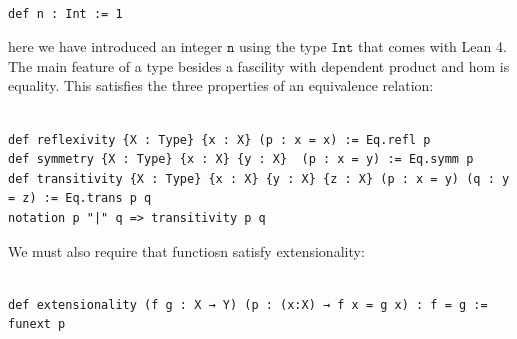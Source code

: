 \documentclass{book}
\newcounter{lcounter}
\begin{document}
\begin{center}
\begin{tcolorbox}[width=5in,colback={white},title={\begin{center}\texttt{Lean \thelcounter} \addtocounter{lcounter}{1}  \end{center}},colbacktitle=Blue,coltitle=black]
\begin{verbatim}

def n : Int := 1

\end{verbatim}%
\end{tcolorbox}
\end{center}

here we have introduced an integer $\texttt{n}$ using the type $\texttt{Int}$ that comes with Lean 4. The main feature of a type besides a fascility with dependent product and hom is equality. This satisfies the three properties of an equivalence relation:

\begin{center}
\begin{tcolorbox}[width=5in,colback={white},title={\begin{center}\texttt{Lean \thelcounter} \addtocounter{lcounter}{1}  \end{center}},colbacktitle=Blue,coltitle=black]
\begin{verbatim}

def reflexivity {X : Type} {x : X} (p : x = x) := Eq.refl p
def symmetry {X : Type} {x : X} {y : X}  (p : x = y) := Eq.symm p
def transitivity {X : Type} {x : X} {y : X} {z : X} (p : x = y) (q : y = z) := Eq.trans p q
notation p "|" q => transitivity p q

\end{verbatim}%
\end{tcolorbox}
\end{center}

We must also require that functiosn satisfy extensionality:

\begin{center}
\begin{tcolorbox}[width=5in,colback={white},title={\begin{center}\texttt{Lean \thelcounter} \addtocounter{lcounter}{1}  \end{center}},colbacktitle=Blue,coltitle=black]
\begin{verbatim}

def extensionality (f g : X → Y) (p : (x:X) → f x = g x) : f = g := funext p

\end{verbatim}%
\end{tcolorbox}
\end{center}
\end{document}
